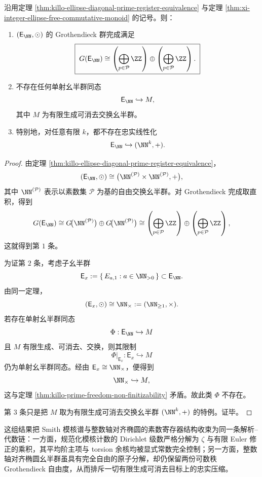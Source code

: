 \begin{theorem}\label{thm:xi-integer-ellipse-grothendieck-double-countable-rank}
沿用定理 \ref{thm:killo-ellipse-diagonal-prime-register-equivalence} 与定理 \ref{thm:xi-integer-ellipse-free-commutative-monoid} 的记号。则：
\begin{enumerate}
  \item \((\mathsf E_{\NN},\odot)\) 的 Grothendieck 群完成满足
  \[
  \boxed{\;
  G(\mathsf E_{\NN})
  \cong
  \left(\bigoplus_{p\in\mathcal P}\ZZ\right)
  \oplus
  \left(\bigoplus_{p\in\mathcal P}\ZZ\right).\;}
  \]
  \item 不存在任何单射幺半群同态
  \[
  \mathsf E_{\NN}\hookrightarrow M,
  \]
  其中 \(M\) 为有限生成可消去交换幺半群。
  \item 特别地，对任意有限 \(k\)，都不存在忠实线性化
  \[
  \mathsf E_{\NN}\hookrightarrow (\NN^k,+).
  \]
\end{enumerate}
\end{theorem}
\begin{proof}
由定理 \ref{thm:killo-ellipse-diagonal-prime-register-equivalence}，
\[
(\mathsf E_{\NN},\odot)
\cong
\bigl(\NN^{(\mathcal P)}\times \NN^{(\mathcal P)},+\bigr),
\]
其中 \(\NN^{(\mathcal P)}\) 表示以素数集 \(\mathcal P\) 为基的自由交换幺半群。对 Grothendieck 完成取直积，得到
\[
G(\mathsf E_{\NN})
\cong
G\!\bigl(\NN^{(\mathcal P)}\bigr)\oplus G\!\bigl(\NN^{(\mathcal P)}\bigr)
\cong
\left(\bigoplus_{p\in\mathcal P}\ZZ\right)\oplus
\left(\bigoplus_{p\in\mathcal P}\ZZ\right),
\]
这就得到第 \(1\) 条。

为证第 \(2\) 条，考虑子幺半群
\[
\mathsf E_x:=\{\,E_{a,1}:a\in\NN_{>0}\,\}\subset \mathsf E_{\NN}.
\]
由同一定理，
\[
(\mathsf E_x,\odot)\cong \NN_{\times}:=(\NN_{\ge 1},\times).
\]
若存在单射幺半群同态
\[
\Phi:\mathsf E_{\NN}\hookrightarrow M
\]
且 \(M\) 有限生成、可消去、交换，则其限制
\[
\Phi|_{\mathsf E_x}:\mathsf E_x\hookrightarrow M
\]
仍为单射幺半群同态。经由 \(\mathsf E_x\cong \NN_{\times}\)，便得到
\[
\NN_{\times}\hookrightarrow M,
\]
这与定理 \ref{thm:killo-prime-freedom-non-finitizability} 矛盾。故此类 \(\Phi\) 不存在。

第 \(3\) 条只是把 \(M\) 取为有限生成可消去交换幺半群 \((\NN^k,+)\) 的特例。证毕。
\end{proof}

\noindent
这组结果把 Smith 模核谱与整数轴对齐椭圆的素数寄存器结构收束为同一条解析--代数链：一方面，规范化模核计数的 Dirichlet 级数严格分解为 \(\zeta\) 与有限 Euler 修正的乘积，其平均阶主项与 torsion 余核均被显式常数完全控制；另一方面，整数轴对齐椭圆幺半群虽具有完全自由的原子分解，却仍保留两份可数秩 Grothendieck 自由度，从而排斥一切有限生成可消去目标上的忠实压缩。

\endinput
